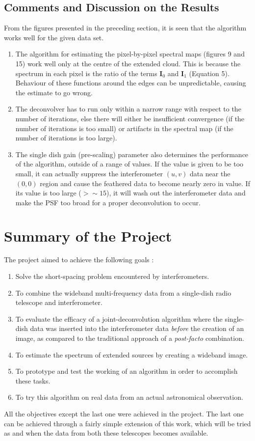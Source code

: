 \documentclass{article}
\begin{document}
\subsection{Comments and Discussion on the Results}
From the figures presented in the preceding section, it is seen that the algorithm works well for the given data set. 
\begin{enumerate}
\item The algorithm for estimating the pixel-by-pixel spectral maps (figures 9 and 15) work well only at the centre of the extended cloud. This is because the spectrum in each pixel is the ratio of the terms $\textbf{I}_0$ and $\textbf{I}_1$ (Equation 5). Behaviour of these functions around the edges can be unpredictable, causing the estimate to go wrong.
\item The deconvolver has to run only within a narrow range with respect to the number of iterations, else there will either be insufficient convergence (if the number of iterations is too small) or artifacts in the spectral map (if the number of iterations is too large).
\item The single dish gain (pre-scaling) parameter also determines the performance of the algorithm, outside of a range of values. If the value is given to be too small, it can actually suppress the interferometer $(u,v)$ data near the $(0,0)$ region and cause the feathered data to become nearly zero in value. If its value is too large ($>\sim 15$), it will wash out the interferometer data and make the PSF too broad for a proper deconvolution to occur.
\end{enumerate} 
\section{Summary of the Project}
The project aimed to achieve the following goals : 
\begin{enumerate}
\item Solve the short-spacing problem encountered by interferometers.
\item To combine the wideband multi-frequency data from a single-dish radio telescope and interferometer.
\item To evaluate the efficacy of a joint-deconvolution algorithm where the single-dish data was inserted into the interferometer data \textit{before} the creation of an image, as compared to the traditional approach of a \textit{post-facto} combination.
\item To estimate the spectrum of extended sources by creating a wideband image.
\item To prototype and test the working of an algorithm in order to accomplish these tasks.
\item To try this algorithm on real data from an actual astronomical observation.
\end{enumerate}
All the objectives except the last one were achieved in the project. The last one can be achieved through a fairly simple extension of this work, which will be tried as and when the data from both these telescopes becomes available.
\end{document}
